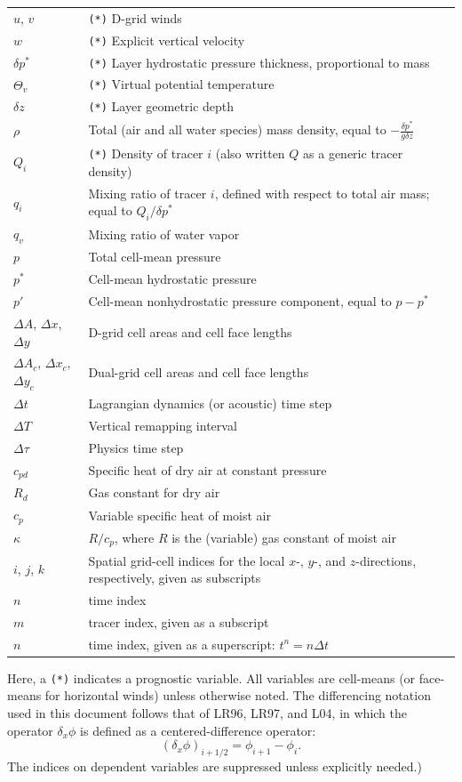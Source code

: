 \documentclass[12pt,letterpaper]{book}
\begin{document}
\begin{longtable}{lp{1cm}}
$u$, $v$ & \texttt{(*)} D-grid winds  \\
$w$ & \texttt{(*)} Explicit vertical velocity \\
$\delta p^*$ & \texttt{(*)} Layer hydrostatic pressure thickness, proportional to mass \\
$\Theta_v$ & \texttt{(*)} Virtual potential temperature \\
$\delta z$  & \texttt{(*)} Layer geometric depth  \\
$\rho $ & Total (air and all water species) mass density, equal to $-\frac{\delta p^*}{g \delta z}$ \\
$Q_i$ & \texttt{(*)} Density of tracer $i$ (also written $Q$ as a generic tracer density) \\ 
$q_i$ & Mixing ratio of tracer $i$, defined with respect to total air mass; equal to $Q_i / \delta p^*$ \\
$q_v$ & Mixing ratio of water vapor \\
$p$ & Total cell-mean pressure \\
$p^*$ & Cell-mean hydrostatic pressure \\
$p'$ & Cell-mean nonhydrostatic pressure component, equal to $p - p^*$ \\
$\Delta A$, $\Delta x$, $\Delta y$ & D-grid cell areas and cell face lengths  \\
$\Delta A_c$, $\Delta x_c$, $\Delta y_c$ & Dual-grid cell areas and cell face lengths  \\
$\Delta t$ & Lagrangian dynamics (or acoustic) time step \\
$\Delta T$ & Vertical remapping interval \\
$\Delta \tau$ & Physics time step \\
$c_{pd}$ & Specific heat of dry air at constant pressure \\
$R_d$ & Gas constant for dry air \\
$c_p$ & Variable specific heat of moist air \\
$\kappa$ & $R/c_p $, where $R$ is the (variable) gas constant of moist air \\
$i$, $j$, $k$ & Spatial grid-cell indices for the local $x$-, $y$-, and $z$-directions, respectively, given as subscripts \\
$n$ & time index \\
$m$ & tracer index, given as a subscript \\
$n$ & time index, given as a superscript: $t^n = n\Delta t$
\end{longtable}
Here, a \texttt{(*)} indicates a prognostic variable. All variables are cell-means (or face-means for horizontal winds) unless otherwise noted. The differencing notation used in this document follows that of LR96, LR97, and L04, in which the operator $\delta_x \phi$ is defined as a centered-difference operator:
\begin{equation}
\left ( \delta_x \phi \right )_{i+1/2} = \phi_{i+1} - \phi_{i}.
\end{equation}
The indices on dependent variables are suppressed unless explicitly needed.)
\end{document}

